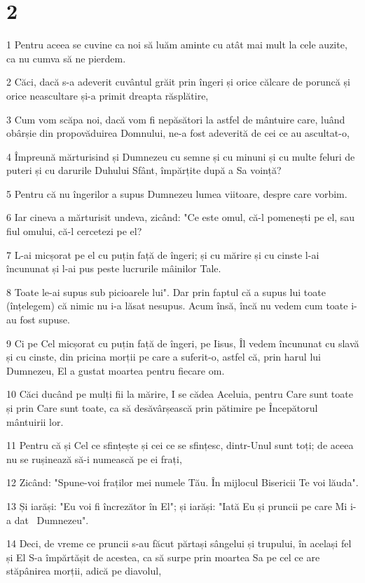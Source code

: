\chapter{2}

\par 1 Pentru aceea se cuvine ca noi să luăm aminte cu atât mai mult la cele auzite, ca nu cumva să ne pierdem.
\par 2 Căci, dacă s-a adeverit cuvântul grăit prin îngeri și orice călcare de poruncă și orice neascultare și-a primit dreapta răsplătire,
\par 3 Cum vom scăpa noi, dacă vom fi nepăsători la astfel de mântuire care, luând obârșie din propovăduirea Domnului, ne-a fost adeverită de cei ce au ascultat-o,
\par 4 Împreună mărturisind și Dumnezeu cu semne și cu minuni și cu multe feluri de puteri și cu darurile Duhului Sfânt, împărțite după a Sa voință?
\par 5 Pentru că nu îngerilor a supus Dumnezeu lumea viitoare, despre care vorbim.
\par 6 Iar cineva a mărturisit undeva, zicând: "Ce este omul, că-l pomenești pe el, sau fiul omului, că-l cercetezi pe el?
\par 7 L-ai micșorat pe el cu puțin față de îngeri; și cu mărire și cu cinste l-ai încununat și l-ai pus peste lucrurile mâinilor Tale.
\par 8 Toate le-ai supus sub picioarele lui". Dar prin faptul că a supus lui toate (înțelegem) că nimic nu i-a lăsat nesupus. Acum însă, încă nu vedem cum toate i-au fost supuse.
\par 9 Ci pe Cel micșorat cu puțin față de îngeri, pe Iisus, Îl vedem încununat cu slavă și cu cinste, din pricina morții pe care a suferit-o, astfel că, prin harul lui Dumnezeu, El a gustat moartea pentru fiecare om.
\par 10 Căci ducând pe mulți fii la mărire, I se cădea Aceluia, pentru Care sunt toate și prin Care sunt toate, ca să desăvârșească prin pătimire pe Începătorul mântuirii lor.
\par 11 Pentru că și Cel ce sfințește și cei ce se sfințesc, dintr-Unul sunt toți; de aceea nu se rușinează să-i numească pe ei frați,
\par 12 Zicând: "Spune-voi fraților mei numele Tău. În mijlocul Bisericii Te voi lăuda".
\par 13 Și iarăși: "Eu voi fi încrezător în El"; și iarăși: "Iată Eu și pruncii pe care Mi i-a dat  Dumnezeu".
\par 14 Deci, de vreme ce pruncii s-au făcut părtași sângelui și trupului, în același fel și El S-a împărtășit de acestea, ca să surpe prin moartea Sa pe cel ce are stăpânirea morții, adică pe diavolul,
